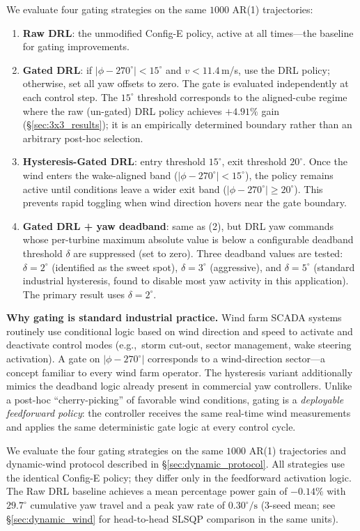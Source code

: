 \documentclass[final,5p,times]{elsarticle}
\begin{document}
We evaluate four gating strategies on the same $1000$ AR(1) trajectories:

\begin{enumerate}
\item \textbf{Raw DRL}: the unmodified Config-E policy, active at all times---the baseline for gating improvements.
\item \textbf{Gated DRL}: if $|\phi{-}270^\circ|{<}15^\circ$ and $v{<}11.4$\,m/s, use the DRL policy; otherwise, set all yaw offsets to zero. The gate is evaluated independently at each control step. The $15^\circ$ threshold corresponds to the aligned-cube regime where the raw (un-gated) DRL policy achieves $+4.91\%$ gain (\S\ref{sec:3x3_results}); it is an empirically determined boundary rather than an arbitrary post-hoc selection.
\item \textbf{Hysteresis-Gated DRL}: entry threshold $15^\circ$, exit threshold $20^\circ$. Once the wind enters the wake-aligned band ($|\phi{-}270^\circ|{<}15^\circ$), the policy remains active until conditions leave a wider exit band ($|\phi{-}270^\circ|{\ge}20^\circ$). This prevents rapid toggling when wind direction hovers near the gate boundary.
\item \textbf{Gated DRL + yaw deadband}: same as (2), but DRL yaw commands whose per-turbine maximum absolute value is below a configurable deadband threshold $\delta$ are suppressed (set to zero). Three deadband values are tested: $\delta{=}2^\circ$ (identified as the sweet spot), $\delta{=}3^\circ$ (aggressive), and $\delta{=}5^\circ$ (standard industrial hysteresis, found to disable most yaw activity in this application). The primary result uses $\delta{=}2^\circ$.
\end{enumerate}

\textbf{Why gating is standard industrial practice.} Wind farm SCADA systems routinely use conditional logic based on wind direction and speed to activate and deactivate control modes (e.g.,~storm cut-out, sector management, wake steering activation). A gate on $|\phi{-}270^\circ|$ corresponds to a wind-direction sector---a concept familiar to every wind farm operator. The hysteresis variant additionally mimics the deadband logic already present in commercial yaw controllers. Unlike a post-hoc ``cherry-picking'' of favorable wind conditions, gating is a \emph{deployable feedforward policy}: the controller receives the same real-time wind measurements and applies the same deterministic gate logic at every control cycle.

We evaluate the four gating strategies on the same $1000$ AR(1) trajectories and dynamic-wind protocol described in \S\ref{sec:dynamic_protocol}. All strategies use the identical Config-E policy; they differ only in the feedforward activation logic. The Raw DRL baseline achieves a mean percentage power gain of $-0.14\%$ with $29.7^\circ$ cumulative yaw travel and a peak yaw rate of $0.30^\circ\!/\!\mathrm{s}$ (3-seed mean; see \S\ref{sec:dynamic_wind} for head-to-head SLSQP comparison in the same units).
\end{document}
